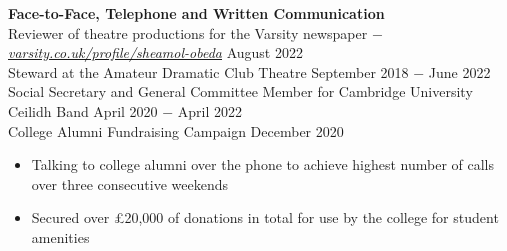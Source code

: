 \documentclass{article}
\begin{document}
\textbf{Face-to-Face, Telephone and Written Communication}\\
Reviewer of theatre productions for the Varsity newspaper $-$ \href{https://www.varsity.co.uk/profile/sheamol-obeda}{\underline{\textit{varsity.co.uk/profile/sheamol-obeda}}} \hfill August 2022 \\
Steward at the Amateur Dramatic Club Theatre \hfill September 2018 $-$ June 2022 \\
Social Secretary and General Committee Member for Cambridge University Ceilidh Band \hfill April 2020 $-$ April 2022\\
College Alumni Fundraising Campaign \hfill December 2020
\begin{itemize}
    \item Talking to college alumni over the phone to achieve highest number of calls over three consecutive weekends
    \item Secured over £20,000 of donations in total for use by the college for student amenities
\end{itemize} \medskip
\end{document}
